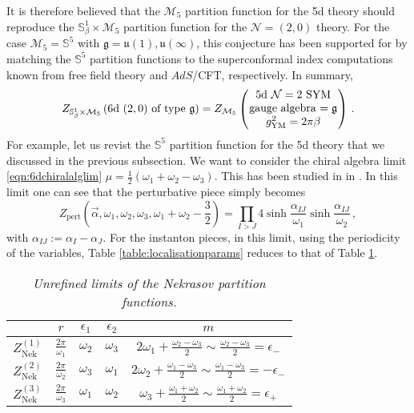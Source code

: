 \documentclass[main.tex]{subfiles}
\begin{document}
It is therefore believed that the $\mathcal{M}_5$ partition function for the 5d theory should reproduce the $\mathbb{S}^1_{\beta}\times \mathcal{M}_5$ partition function for the $\mathcal{N}=(2,0)$ theory.  For the case $\mathcal{M}_5=\mathbb{S}^5$ with $\mathfrak{g}=\mathfrak{u}(1),\mathfrak{u}(\infty)$, this conjecture has been supported for \cite{Kim:2012ava,Kim:2013nva} by matching the $\mathbb{S}^5$ partition functions to the superconformal index computations known from free field theory and $AdS$/CFT, respectively.
In summary,
\begin{equation}
Z_{\mathbb{S}_{\beta}^1\times\mathcal{M}_5}\left(\text{6d $(2,0)$ of type $\mathfrak{g}$}\right)=Z_{\mathcal{M}_5}\left(\parbox{8em}{\centering 5d $\mathcal{N}=2$ SYM\\ gauge algebra $=\mathfrak{g}$ \\ $g^2_{\text{YM}}=2\pi\beta$}\right)\,.
\end{equation} 
For example, let us revist the $\mathbb{S}^5$ partition function for the 5d theory that we discussed in the previous subsection.  We want to consider the chiral algebra limit \eqref{eqn:6dchiralalglim} $\mu=\frac{1}{2}(\omega_1+\omega_2-\omega_3)$.  This has been studied in in \cite{Bullimore:2014upa,Beem:2014kka,Kim:2013nva}.
In this limit one can see that the perturbative piece simply becomes
\begin{equation}
Z_{\text{pert}}\left(\vec{\alpha},\omega_1,\omega_2,\omega_3,\omega_1+\omega_2-\frac{3}{2}\right)=\prod_{I>J}4\sinh\frac{\alpha_{IJ}}{\omega_1}\sinh\frac{\alpha_{IJ}}{\omega_2}\,,
\end{equation}
with $\alpha_{IJ}:=\alpha_I-\alpha_J$.
For the instanton pieces, in this limit, using the periodicity of the variables, Table \ref{table:localisationparams} reduces to that of Table \ref{table:unrefined}.
\begin{table}[ht!]
\centering
\begin{tabular}{|c c c c c|} 
 \hline
 & $r$ & $\epsilon_1$ & $\epsilon_2$ & $m$ \\ [0.5ex] 
 \hline\hline
  $Z^{(1)}_{\text{Nek}}$ & $\frac{2\pi}{\omega_1}$ & $\omega_2$ & $\omega_3$ &$2 \omega_1 + \frac{\omega_2- \omega_3}{2}\sim\frac{\omega_2-\omega_3}{2}=\epsilon_-$ \\ 
  $Z^{(2)}_{\text{Nek}}$ & $\frac{2\pi}{\omega_2}$ & $\omega_3$ & $\omega_1$ &$2 \omega_2 + \frac{\omega_1- \omega_3}{2}\sim\frac{\omega_1-\omega_3}{2}=-\epsilon_-$ \\ 
    $Z^{(3)}_{\text{Nek}}$ & $\frac{2\pi}{\omega_3}$ & $\omega_1$ & $\omega_2$ &$\omega_3 + \frac{\omega_1+ \omega_2}{2}\sim\frac{\omega_1+\omega_2}{2}=\epsilon_+$ \\ 
 \hline
\end{tabular}
\caption{\it Unrefined limits of the Nekrasov partition functions.}
\label{table:unrefined}
\end{table}
\end{document}
